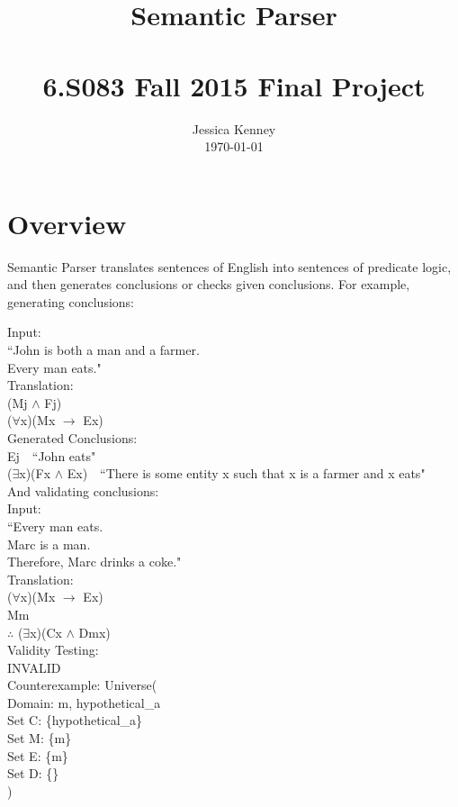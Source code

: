 \documentclass[a4paper, 11pt]{article}
\title{ Semantic Parser \\
        \normalsize \ \\
		\normalsize 6.S083 Fall 2015 Final Project \\ [25pt]
}
\author{Jessica Kenney\\\today}
\date{}
\begin{document}
\maketitle
\tableofcontents
\newpage\section{Overview}
Semantic Parser translates sentences of English into sentences of predicate logic, and then generates conclusions or checks given conclusions. For example, generating conclusions:

\noindent Input:\\
\indent ``John is both a man and a farmer.\\
\indent Every man eats."\\

\noindent Translation:\\
\indent (Mj $\wedge$ Fj)\\
\indent ($\forall$x)(Mx $\rightarrow$ Ex)\\

\noindent Generated Conclusions:\\
\indent Ej\ \ ``John eats"\\
\indent ($\exists$x)(Fx $\wedge$ Ex)\ \ ``There is some entity x such that x is a farmer and x eats"\\

\noindent And validating conclusions:\\
\noindent Input:\\
\indent ``Every man eats.\\
\indent Marc is a man.\\
\indent Therefore, Marc drinks a coke."\\

\noindent Translation:\\
\indent ($\forall$x)(Mx $\rightarrow$ Ex)\\
\indent Mm\\
\indent $\therefore$ ($\exists$x)(Cx $\wedge$ Dmx)\\

\noindent Validity Testing:\\
\indent INVALID\\
\indent Counterexample: Universe(\\
\indent\indent Domain: m, hypothetical\_a \\
\indent\indent Set C: \{hypothetical\_a\}\\
\indent\indent Set M: \{m\}\\
\indent\indent Set E: \{m\}\\
\indent\indent Set D: \{\}\\
\indent  )\\
\end{document}

